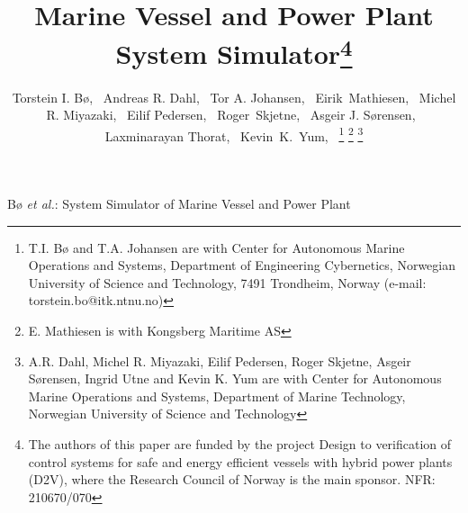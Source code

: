 \documentclass[journal]{IEEEtran}
\begin{document}

\title{Marine Vessel and Power Plant System Simulator\footnote{The authors of this paper are funded by the project Design to verification of control systems for safe and energy efficient vessels with hybrid power plants (D2V), where the Research Council of Norway is the main sponsor. NFR: 210670/070}} 

\author{Torstein I. Bø,~
	Andreas R. Dahl,~
	Tor A. Johansen,~
	Eirik~Mathiesen,~
	Michel R. Miyazaki,~
	Eilif Pedersen,~
	Roger~Skjetne,~
	Asgeir J. Sørensen,~
	Laxminarayan Thorat,~
	Kevin~K.~Yum,~
\thanks{T.I. Bø and T.A. Johansen are with Center for Autonomous Marine Operations and Systems, Department of Engineering Cybernetics, Norwegian University of Science and Technology, 7491
	Trondheim, Norway (e-mail: torstein.bo@itk.ntnu.no)}
\thanks{E. Mathiesen is with Kongsberg Maritime AS}%
\thanks{A.R. Dahl, Michel R. Miyazaki, Eilif Pedersen, Roger Skjetne, Asgeir Sørensen, Ingrid Utne and Kevin K. Yum are with Center for Autonomous Marine Operations and Systems, Department of Marine Technology, Norwegian University of Science and Technology}%
}%



%
{Bø \MakeLowercase{\textit{et al.}}: System Simulator of Marine Vessel and Power Plant}
\maketitle
\end{document}
